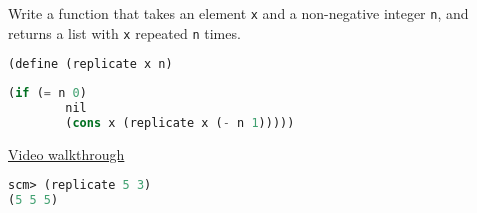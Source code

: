 \question Write a function that takes an element {\tt x} and a
non-negative integer {\tt n}, and returns a list with {\tt x} repeated
{\tt n} times.
\begin{lstlisting}[language=Scheme]
(define (replicate x n)
\end{lstlisting}
\begin{solution}[1.5in]
\begin{lstlisting}[language=Scheme]
    (if (= n 0)
        nil
        (cons x (replicate x (- n 1)))))
\end{lstlisting}
\href{https://youtu.be/8FO2ZYkXwb0?t=3m55s}{Video walkthrough}
\end{solution}
\begin{lstlisting}[language=Scheme]
scm> (replicate 5 3)
(5 5 5)
\end{lstlisting}
